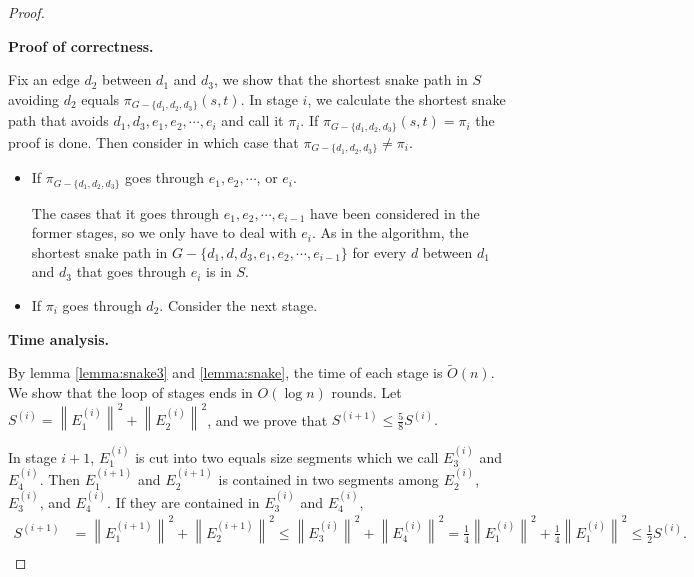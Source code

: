 \documentclass[11pt]{article}
\theoremstyle{plain}
\theoremstyle{definition}
\newcommand{\too}[1]{\tilde{O}({#1})}
\begin{document}
\begin{proof}
\begin{itemize}
\begin{center}
\begin{tikzpicture}[x=0.75pt,y=0.75pt,yscale=-1,xscale=1]
\end{tikzpicture}
     \end{center}
\end{itemize}

\noindent\textbf{Proof of correctness.}

Fix an edge $d_2$ between $d_1$ and $d_3$, we show that the shortest snake path in $S$ avoiding $d_2$ equals $\pi_{G-\{d_1,d_2,d_3\}}(s, t).$ In stage $i$, we calculate the shortest snake path that avoids $d_1,d_3,e_1,e_2,\cdots,e_i$ and call it $\pi_i.$ If $\pi_{G-\{d_1,d_2,d_3\}}(s, t)= \pi_i$ the proof is done. Then consider in which case that $\pi_{G-\{d_1,d_2,d_3\}}\ne \pi_i.$

\begin{itemize}
    \item If $\pi_{G-\{d_1,d_2,d_3\}}$ goes through $e_1, e_2,\cdots$, or $e_i.$ 

The cases that it goes through $e_1,e_2,\cdots,e_{i-1}$ have been considered in the former stages, so we only have to deal with $e_i.$ As in the algorithm, the shortest snake path in $G-\{d_1,d,d_3,e_1,e_2,\cdots,e_{i-1}\}$ for every $d$ between $d_1$ and $d_3$ that goes through $e_i$ is in $S.$ 

\item If $\pi_i$ goes through $d_2.$
Consider the next stage.

\end{itemize}

\noindent\textbf{Time analysis.}

By lemma \ref{lemma:snake3} and \ref{lemma:snake}, the time of each stage is $\too{n}.$ We show that the loop of stages ends in $O(\log{n})$ rounds. Let $S^{(i)}= {\left\| E_1^{(i)}\right\|}^2+{\left\| E_2^{(i)}\right\|}^2$, and we prove that $S^{(i+1)}\le\frac{5}{8}S^{(i)}.$

In stage $i+1$, $E_1^{(i)}$ is cut into two equals size segments which we call $E_3^{(i)}$ and $E_4^{(i)}.$ Then $E_1^{(i+1)}$ and $E_2^{(i+1)}$ is contained in two segments among $E_2^{(i)}$, $E_3^{(i)}$, and $E_4^{(i)}.$ If they are contained in $E_3^{(i)}$ and $E_4^{(i)}$,
\begin{equation*}
\begin{split}
    S^{(i+1)}&={\left\| E_1^{(i+1)}\right\|}^2+{\left\| E_2^{(i+1)}\right\|}^2
    \le{\left\| E_3^{(i)}\right\|}^2+{\left\| E_4^{(i)}\right\|}^2
    =\frac{1}{4}{\left\| E_1^{(i)}\right\|}^2+\frac{1}{4}{\left\| E_1^{(i)}\right\|}^2
    \le\frac{1}{2}S^{(i)}.\\
\end{split}
\end{equation*}


\end{proof}
\end{document}
